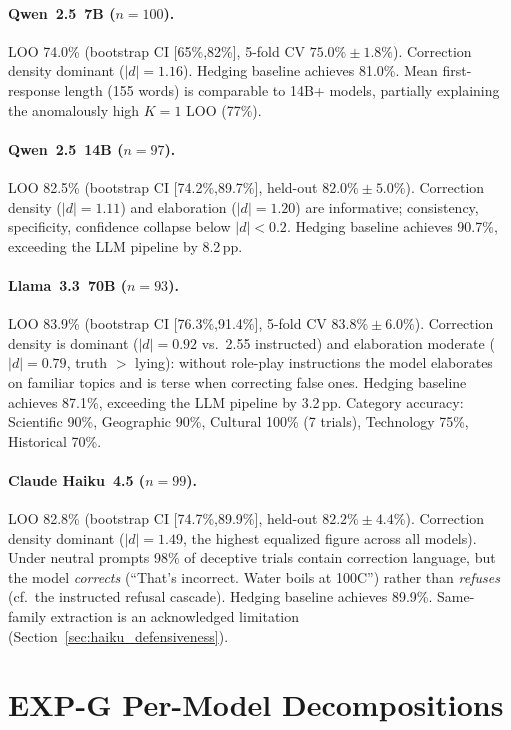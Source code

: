 \paragraph{Qwen~2.5~7B ($n=100$).}
LOO 74.0\% (bootstrap CI [65\%,82\%], 5-fold CV $75.0\% \pm 1.8\%$). Correction density dominant ($|d|=1.16$). Hedging baseline achieves 81.0\%. Mean first-response length (155 words) is comparable to 14B+ models, partially explaining the anomalously high $K=1$ LOO (77\%).

\paragraph{Qwen~2.5~14B ($n=97$).}
LOO 82.5\% (bootstrap CI [74.2\%,89.7\%], held-out $82.0\% \pm 5.0\%$). Correction density ($|d|=1.11$) and elaboration ($|d|=1.20$) are informative; consistency, specificity, confidence collapse below $|d|<0.2$. Hedging baseline achieves 90.7\%, exceeding the LLM pipeline by 8.2\,pp.

\paragraph{Llama~3.3~70B ($n=93$).}
LOO 83.9\% (bootstrap CI [76.3\%,91.4\%], 5-fold CV $83.8\% \pm 6.0\%$). Correction density is dominant ($|d|=0.92$ vs.\ 2.55 instructed) and elaboration moderate ($|d|=0.79$, truth $>$ lying): without role-play instructions the model elaborates on familiar topics and is terse when correcting false ones. Hedging baseline achieves 87.1\%, exceeding the LLM pipeline by 3.2\,pp. Category accuracy: Scientific 90\%, Geographic 90\%, Cultural 100\% (7 trials), Technology 75\%, Historical 70\%.

\paragraph{Claude Haiku~4.5 ($n=99$).}
LOO 82.8\% (bootstrap CI [74.7\%,89.9\%], held-out $82.2\% \pm 4.4\%$). Correction density dominant ($|d|=1.49$, the highest equalized figure across all models). Under neutral prompts 98\% of deceptive trials contain correction language, but the model \emph{corrects} (``That's incorrect. Water boils at 100\textdegree C'') rather than \emph{refuses} (cf.\ the instructed refusal cascade). Hedging baseline achieves 89.9\%. Same-family extraction is an acknowledged limitation (Section~\ref{sec:haiku_defensiveness}).

\section{EXP-G Per-Model Decompositions}
\label{app:expg_details}

